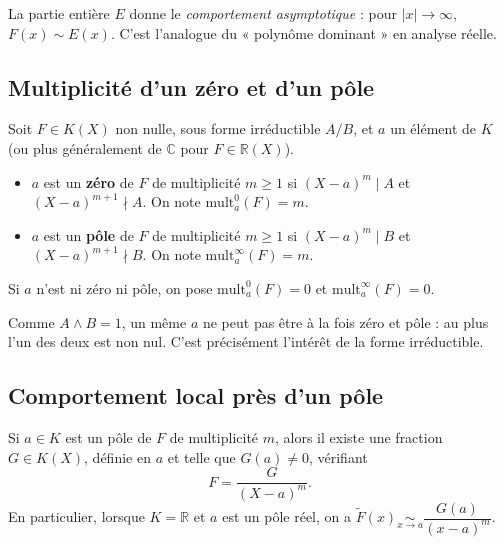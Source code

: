 \begin{remarque}
La partie entière $E$ donne le \emph{comportement asymptotique} : pour $|x| \to \infty$, $F(x) \sim E(x)$. C'est l'analogue du « polynôme dominant » en analyse réelle.
\end{remarque}

\subsection{Multiplicité d'un zéro et d'un pôle}

\begin{definition}
Soit $F \in K(X)$ non nulle, sous forme irréductible $A/B$, et $a$ un élément de $K$ (ou plus généralement de $\mathbb{C}$ pour $F \in \mathbb{R}(X)$).
\begin{itemize}
    \item $a$ est un \textbf{zéro} de $F$ de multiplicité $m \ge 1$ si $(X - a)^m \mid A$ et $(X - a)^{m+1} \nmid A$. On note $\mathrm{mult}^0_a(F) = m$.
    \item $a$ est un \textbf{pôle} de $F$ de multiplicité $m \ge 1$ si $(X - a)^m \mid B$ et $(X - a)^{m+1} \nmid B$. On note $\mathrm{mult}^\infty_a(F) = m$.
\end{itemize}
Si $a$ n'est ni zéro ni pôle, on pose $\mathrm{mult}^0_a(F) = 0$ et $\mathrm{mult}^\infty_a(F) = 0$.
\end{definition}

\begin{remarque}
Comme $A \wedge B = 1$, un même $a$ ne peut pas être à la fois zéro et pôle : au plus l'un des deux est non nul. C'est précisément l'intérêt de la forme irréductible.
\end{remarque}

\subsection{Comportement local près d'un pôle}

\begin{proposition}
Si $a \in K$ est un pôle de $F$ de multiplicité $m$, alors il existe une fraction $G \in K(X)$, définie en $a$ et telle que $G(a) \neq 0$, vérifiant
\[ F = \frac{G}{(X - a)^m}. \]
En particulier, lorsque $K = \mathbb{R}$ et $a$ est un pôle réel, on a $\widetilde{F}(x) \underset{x \to a}{\sim} \dfrac{G(a)}{(x - a)^m}$.
\end{proposition}

